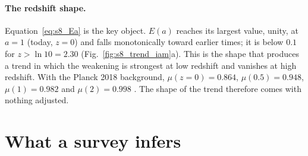 \paragraph{The redshift shape.} Equation~\eqref{eq:s8_Ea} is the key object. $E(a)$ reaches its largest value, unity, at $a=1$ (today, $z=0$) and
falls monotonically toward earlier times; it is below $0.1$ for $z>\ln10=2.30$ (Fig.~\ref{fig:s8_trend_iam}a). This is the shape that produces a trend
in which the weakening is strongest at low redshift and vanishes at high redshift. With the Planck 2018 background, $\mu(z{=}0)=0.864$,
$\mu(0.5)=0.948$, $\mu(1)=0.982$ and $\mu(2)=0.998$ \calc. The shape of the trend therefore comes with nothing adjusted.

\section{What a survey infers}

